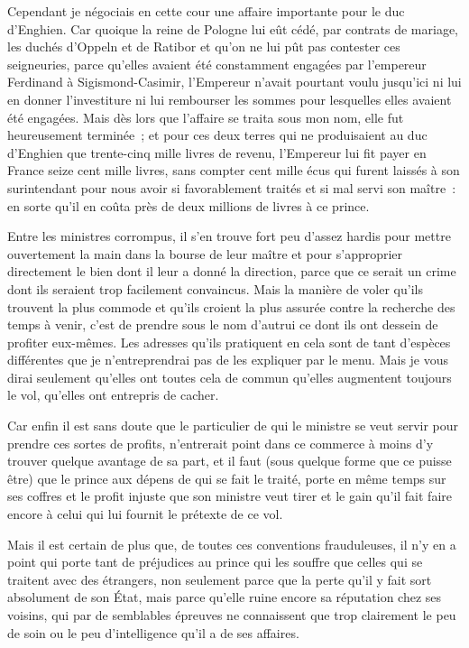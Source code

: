 \documentclass[french,twoside]{book} %
\begin{document}
Cependant je négociais en cette cour une affaire importante pour le duc d’Enghien. Car quoique la reine de Pologne lui eût cédé, par contrats de mariage, les duchés d’Oppeln et de Ratibor et qu’on ne lui pût pas contester ces seigneuries, parce qu’elles avaient été constamment engagées par l’empereur Ferdinand à Sigismond-Casimir, l’Empereur n’avait pourtant voulu jusqu’ici ni lui en donner l’investiture ni lui rembourser les sommes pour lesquelles elles avaient été engagées. Mais dès lors que l’affaire se traita sous mon nom, elle fut heureusement terminée ; et pour ces deux terres qui ne produisaient au duc d’Enghien que trente-cinq mille livres de revenu, l’Empereur lui fit payer en France seize cent mille livres, sans compter cent mille écus qui furent laissés à son surintendant pour nous avoir si favorablement traités et si mal servi son maître : en sorte qu’il en coûta près de deux millions de livres à ce prince.\par
Entre les ministres corrompus, il s’en trouve fort peu d’assez hardis pour mettre ouvertement la main dans la bourse de leur maître et pour s’approprier directement le bien dont il leur a donné la direction, parce que ce serait un crime dont ils seraient trop facilement convaincus. Mais la manière de voler qu’ils trouvent la plus commode et qu’ils croient la plus assurée contre la recherche des temps à venir, c’est de prendre sous le nom d’autrui ce dont ils ont dessein de profiter eux-mêmes. Les adresses qu’ils pratiquent en cela sont de tant d’espèces différentes que je n’entreprendrai pas de les expliquer par le menu. Mais je vous dirai seulement qu’elles ont toutes cela de commun qu’elles augmentent toujours le vol, qu’elles ont entrepris de cacher.\par
Car enfin il est sans doute que le particulier de qui le ministre se veut servir pour prendre ces sortes de profits, n’entrerait point dans ce commerce à moins d’y trouver quelque avantage de sa part, et il faut (sous quelque forme que ce puisse être) que le prince aux dépens de qui se fait le traité, porte en même temps sur ses coffres et le profit injuste que son ministre veut tirer et le gain qu’il fait faire encore à celui qui lui fournit le prétexte de ce vol.\par
Mais il est certain de plus que, de toutes ces conventions frauduleuses, il n’y en a point qui porte tant de préjudices au prince qui les souffre que celles qui se traitent avec des étrangers, non seulement parce que la perte qu’il y fait sort absolument de son État, mais parce qu’elle ruine encore sa réputation chez ses voisins, qui par de semblables épreuves ne connaissent que trop clairement le peu de soin ou le peu d’intelligence qu’il a de ses affaires.\par
\end{document}

